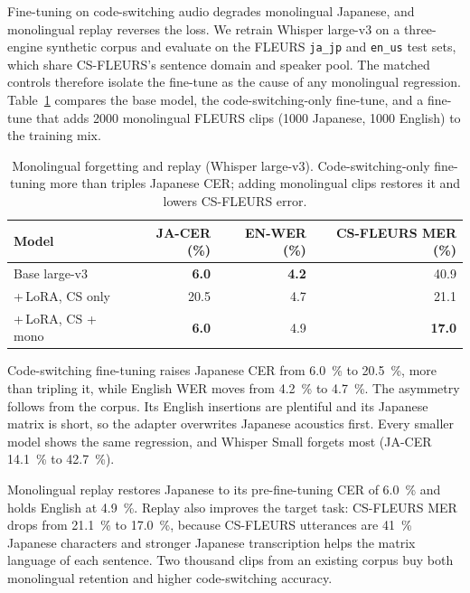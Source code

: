 \documentclass[11pt,a4paper]{article}
\newcommand{\best}[1]{\textbf{#1}}
\begin{document}
Fine-tuning on code-switching audio degrades monolingual Japanese, and monolingual
replay reverses the loss. We retrain Whisper large-v3 on a three-engine synthetic
corpus and evaluate on the FLEURS \texttt{ja\_jp} and \texttt{en\_us} test sets,
which share CS-FLEURS's sentence domain and speaker pool. The matched controls
therefore isolate the fine-tune as the cause of any monolingual regression.
Table~\ref{tab:forgetting} compares the base model, the code-switching-only
fine-tune, and a fine-tune that adds \num{2000} monolingual FLEURS clips
(\num{1000} Japanese, \num{1000} English) to the training mix.

\begin{table}[t]
\centering
\caption{Monolingual forgetting and replay (Whisper large-v3). Code-switching-only
fine-tuning more than triples Japanese CER; adding monolingual clips restores it and
lowers CS-FLEURS error.}
\label{tab:forgetting}
\small
\begin{tabular}{lrrr}
\toprule
Model & JA-CER (\%) & EN-WER (\%) & CS-FLEURS MER (\%) \\
\midrule
Base large-v3            & \best{6.0} & \best{4.2} & 40.9 \\
{+}\,LoRA, CS only       & 20.5 & 4.7 & 21.1 \\
{+}\,LoRA, CS {+} mono   & \best{6.0} & 4.9 & \best{17.0} \\
\bottomrule
\end{tabular}
\end{table}

Code-switching fine-tuning raises Japanese CER from \SI{6.0}{\percent} to
\SI{20.5}{\percent}, more than tripling it, while English WER moves from
\SI{4.2}{\percent} to \SI{4.7}{\percent}. The asymmetry follows from the corpus.
Its English insertions are plentiful and its Japanese matrix is short, so the
adapter overwrites Japanese acoustics first. Every smaller model shows the same
regression, and Whisper Small forgets most (JA-CER \SI{14.1}{\percent} to
\SI{42.7}{\percent}).

Monolingual replay restores Japanese to its pre-fine-tuning CER of
\SI{6.0}{\percent} and holds English at \SI{4.9}{\percent}. Replay also improves
the target task: CS-FLEURS MER drops from \SI{21.1}{\percent} to
\SI{17.0}{\percent}, because CS-FLEURS utterances are \SI{41}{\percent} Japanese
characters and stronger Japanese transcription helps the matrix language of each
sentence. Two thousand clips from an existing corpus buy both monolingual retention
and higher code-switching accuracy.
\end{document}
